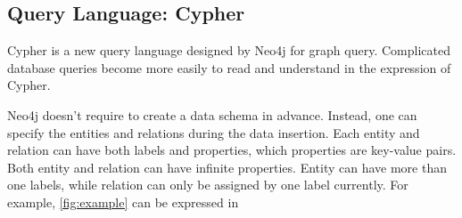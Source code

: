 \documentclass[letterpaper,twocolumn,11pt]{article}
\begin{document}
\subsection{Query Language: Cypher}
Cypher is a new query language designed by Neo4j for graph query. Complicated database queries become more easily to read and understand in the expression of Cypher.

Neo4j doesn't require to create a data schema in advance. Instead, one can specify the entities and relations during the data insertion. Each entity and relation can have both labels and properties, which properties are key-value pairs. Both entity and relation can have infinite properties. Entity can have more than one labels, while relation can only be assigned by one label currently. For example, 
\autoref{fig:example} can be expressed in \\
\end{document}
